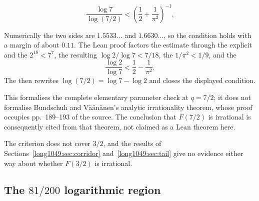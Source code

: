 \begin{theorem}\label{long1049:res:sevenhalves}
\[
 \frac{\log 7}{\log(7/2)}
 <
 \left(\frac12+\frac1{\pi^2}\right)^{-1}.
\]
\end{theorem}

\noindent Numerically the two sides are $1.5533\ldots$ and $1.6630\ldots$, so
the condition holds with a margin of about $0.11$.  The Lean proof factors the
estimate through the explicit
 and the
 $2^{18}<7^7$, the resulting
 $\log2/\log7<7/18$, the
$1/\pi^2<1/9$, and the
\[
 \frac{\log2}{\log7}<\frac12-\frac1{\pi^2}.
\]
The
 then rewrites
$\log(7/2)=\log7-\log2$ and closes the displayed condition.

This formalises the complete elementary parameter check at $q=7/2$; it does
not formalise Bundschuh and V\"a\"an\"anen's analytic irrationality theorem,
whose proof occupies pp.~189--193 of the source.  The conclusion that
$F(7/2)$ is irrational is consequently cited from that theorem, not claimed as
a Lean theorem here.

The criterion does not cover $3/2$, and the results of
Sections~\ref{long1049:sec:corridor} and~\ref{long1049:sec:tail} give no evidence either way
about whether $F(3/2)$ is irrational.

\subsection{The $81/200$ logarithmic region}

